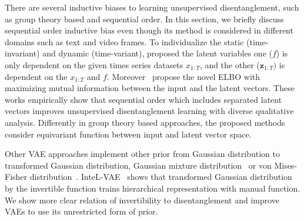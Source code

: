 There are several inductive biases to learning unsupervised disentanglement, such as group theory based and sequential order.
In this section, we briefly discuss sequential order inductive bias even though its method is considered in different domains such as text and video frames.
To individualize the static (time-invariant) and dynamic (time-variant), \cite{sequential-autoencoder, contrastively-vae} proposed the latent variables one ($f$) is only dependent on the given times series datasets $x_{1:T}$, and the other ($\mathbf{z}_{1:T})$ is dependent on the $x_{1:T}$ and $f$.
Moreover~\cite{contrastively-vae} propose the novel ELBO with maximizing mutual information between the input and the latent vectors.
These works empirically show that sequential order which includes separated latent vectors improves unsupervised disentanglement learning with diverse qualitative analysis.
Differently in group theory based approaches, the proposed methods consider equivariant function between input and latent vector space.


Other VAE approaches implement other prior from Gaussian distribution to transformed Gaussian distribution, Gaussian mixture distribution~\cite{gaussian-mixture} or von Mises-Fisher distribution~\cite{hyper-vae}.
InteL-VAE~\cite{intel-vae} shows that transformed Gaussian distribution by the invertible function trains hierarchical representation with manual function.
We show more clear relation of invertibility to disentanglement and improve VAEs to use its unrestricted form of prior.


